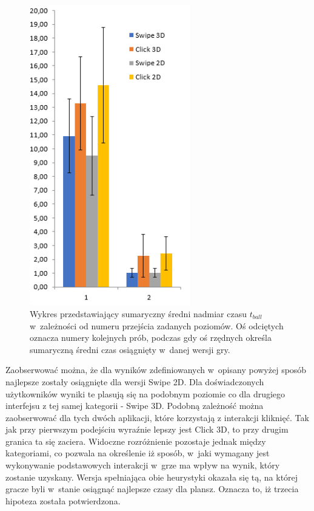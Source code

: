\documentclass[a4paper,12pt,numbers=noenddot]{report}
\begin{document}
\begin{figure}[h!]
	\centering
  	\includegraphics[width=7cm]{diag/tBall_sum.png}
	\caption{Wykres przedstawiający sumaryczny średni nadmiar czasu $t_{ball}$ w~zależności od numeru przejścia zadanych poziomów. Oś odciętych oznacza numery kolejnych prób, podczas gdy oś rzędnych określa sumaryczną średni czas osiągnięty w~danej wersji gry.}
	\label{fig:diag_tball_sum}
\end{figure}

Zaobserwować można, że dla wyników zdefiniowanych w~opisany powyżej sposób najlepsze zostały osiągnięte dla wersji Swipe 2D. Dla doświadczonych użytkowników wyniki te plasują się na podobnym poziomie co dla drugiego interfejsu z tej samej kategorii - Swipe 3D. Podobną zależność można zaobserwować dla tych dwóch aplikacji, które korzystają z interakcji kliknięć. Tak jak przy pierwszym podejściu wyraźnie lepszy jest Click 3D, to przy drugim granica ta się zaciera. Widoczne rozróżnienie pozostaje jednak między kategoriami, co pozwala na określenie iż sposób, w~jaki wymagany jest wykonywanie podstawowych interakcji w~grze ma wpływ na wynik, który zostanie uzyskany. Wersja spełniająca obie heurystyki okazała się tą, na której gracze byli w~stanie osiągnąć najlepsze czasy dla plansz. Oznacza to, iż trzecia hipoteza została potwierdzona.


\end{document}
